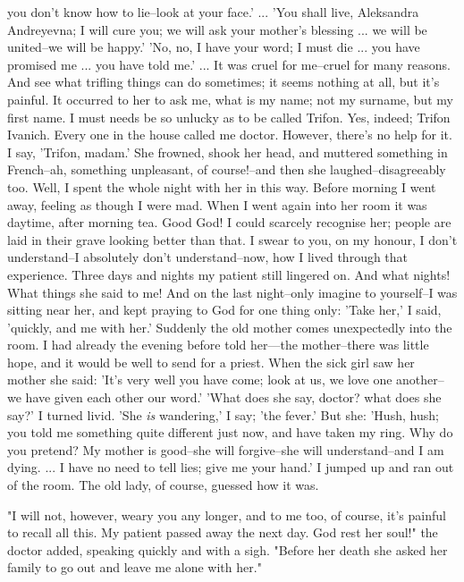 you don't know how to lie--look at your face.' ... 'You shall live,
Aleksandra Andreyevna; I will cure you; we will ask your mother's
blessing ... we will be united--we will be happy.' 'No, no, I have
your word; I must die ... you have promised me ... you have told me.'
... It was cruel for me--cruel for many reasons. And see what trifling
things can do sometimes; it seems nothing at all, but it's painful. It
occurred to her to ask me, what is my name; not my surname, but my
first name. I must needs be so unlucky as to be called Trifon. Yes,
indeed; Trifon Ivanich. Every one in the house called me doctor.
However, there's no help for it. I say, 'Trifon, madam.' She frowned,
shook her head, and muttered something in French--ah, something
unpleasant, of course!--and then she laughed--disagreeably too. Well,
I spent the whole night with her in this way. Before morning I went
away, feeling as though I were mad. When I went again into her room it
was daytime, after morning tea. Good God! I could scarcely recognise
her; people are laid in their grave looking better than that. I swear
to you, on my honour, I don't understand--I absolutely don't
understand--now, how I lived through that experience. Three days and
nights my patient still lingered on. And what nights! What things she
said to me! And on the last night--only imagine to yourself--I was
sitting near her, and kept praying to God for one thing only: 'Take
her,' I said, 'quickly, and me with her.' Suddenly the old mother
comes unexpectedly into the room. I had already the evening before
told her---the mother--there was little hope, and it would be well to
send for a priest. When the sick girl saw her mother she said: 'It's
very well you have come; look at us, we love one another--we have
given each other our word.' 'What does she say, doctor? what does she
say?' I turned livid. 'She \emph{is} wandering,' I say; 'the fever.' But
she: 'Hush, hush; you told me something quite different just now, and
have taken my ring. Why do you pretend? My mother is good--she will
forgive--she will understand--and I am dying. ... I have no need to
tell lies; give me your hand.' I jumped up and ran out of the room.
The old lady, of course, guessed how it was.

"I will not, however, weary you any longer, and to me too, of course,
it's painful to recall all this. My patient passed away the next day.
God rest her soul!" the doctor added, speaking quickly and with a
sigh. "Before her death she asked her family to go out and leave me
alone with her."

